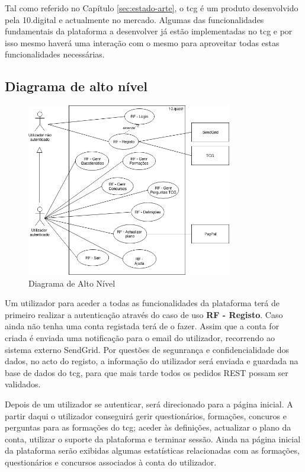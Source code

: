 Tal como referido no Capítulo \ref{sec:estado-arte}, o \acrshort{tcg} é um produto desenvolvido pela 10.digital e actualmente no mercado. Algumas das funcionalidades fundamentais da plataforma a desenvolver já estão implementadas no \acrshort{tcg}  e por isso mesmo haverá uma interação com o mesmo para aproveitar todas estas funcionalidades necessárias.


\newpage

\subsection{Diagrama de alto nível}
\label{d:altonivel}
\begin{figure}[ht!]
	\begin{center}
		\includegraphics[width=0.8\textwidth]{img/rf/alto-nivel}
		\caption{Diagrama de Alto Nível}
		\label{fig:rf-alto-nivel}
	\end{center}
\end{figure}

Um utilizador para aceder a todas as funcionalidades da plataforma terá de primeiro realizar a autenticação através do caso de uso \textbf{RF - Registo}. Caso ainda não tenha uma conta registada terá de o fazer. Assim que a conta for criada é enviada uma notificação para o email do utilizador, recorrendo ao sistema externo SendGrid. Por questões de segunrança e confidencialidade dos dados, no acto do registo, a informação do utilizador será enviada e guardada na base de dados do \acrshort{tcg}, para que mais tarde todos os pedidos REST possam ser validados.

Depois de um utilizador se autenticar, será direcionado para a página inicial. A partir daqui o utilizador conseguirá gerir questionários, formações, concuros e perguntas para as formações do \acrshort{tcg}; aceder às definições, actualizar o plano da conta, utilizar o suporte da plataforma e terminar sessão.
Ainda na página inicial da plataforma serão exibidas algumas estatísticas relacionadas com as formações, questionários e concursos associados à conta do utilizador. 

